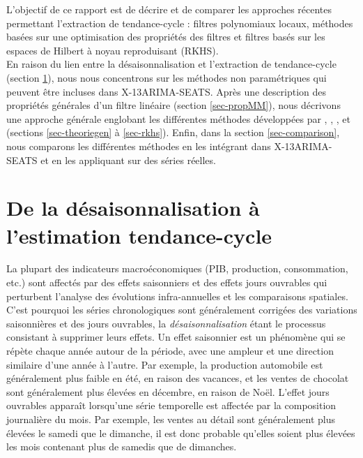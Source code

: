 \documentclass[
  11pt,
  french,
  a4paper]{article}
\newcommand\1{\mathds{1}}
\begin{document}
L'objectif de ce rapport est de décrire et de comparer les approches récentes permettant l'extraction de tendance-cycle : filtres polynomiaux locaux, méthodes basées sur une optimisation des propriétés des filtres et filtres basés sur les espaces de Hilbert à noyau reproduisant (RKHS).\\
En raison du lien entre la désaisonnalisation et l'extraction de tendance-cycle (section \ref{sec-SAtoTCE}), nous nous concentrons sur les méthodes non paramétriques qui peuvent être incluses dans X-13ARIMA-SEATS.
Après une description des propriétés générales d'un filtre linéaire (section \ref{sec-propMM}), nous décrivons une approche générale englobant les différentes méthodes développées par \textcite{proietti2008}, \textcite{GrayThomson1996}, \textcite{ch15HBSA}, \textcite{trilemmaWMR2019} et \textcite{dagumbianconcini2008} (sections \ref{sec-theoriegen} à \ref{sec-rkhs}).
Enfin, dans la section \ref{sec-comparison}, nous comparons les différentes méthodes en les intégrant dans X-13ARIMA-SEATS et en les appliquant sur des séries réelles.

\newpage

\hypertarget{sec-SAtoTCE}{%
\section{De la désaisonnalisation à l'estimation tendance-cycle}\label{sec-SAtoTCE}}

La plupart des indicateurs macroéconomiques (PIB, production, consommation, etc.) sont affectés par des effets saisonniers et des effets jours ouvrables qui perturbent l'analyse des évolutions infra-annuelles et les comparaisons spatiales.
C'est pourquoi les séries chronologiques sont généralement corrigées des variations saisonnières et des jours ouvrables, la \emph{désaisonnalisation} étant le processus consistant à supprimer leurs effets.
Un effet saisonnier est un phénomène qui se répète chaque année autour de la période, avec une ampleur et une direction similaire d'une année à l'autre.
Par exemple, la production automobile est généralement plus faible en été, en raison des vacances, et les ventes de chocolat sont généralement plus élevées en décembre, en raison de Noël.
L'effet jours ouvrables apparaît lorsqu'une série temporelle est affectée par la composition journalière du mois.
Par exemple, les ventes au détail sont généralement plus élevées le samedi que le dimanche, il est donc probable qu'elles soient plus élevées les mois contenant plus de samedis que de dimanches.
\end{document}
